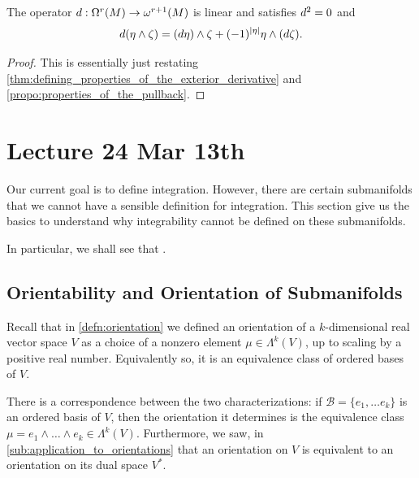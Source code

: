 \documentclass[notoc,notitlepage]{tufte-book}
\begin{document}
\begin{propo}\label{propo:square_of_the_exterior_derivative_is_a_zero_map_on_submanifolds}
  The operator $\mathop{}\!d{} : \Omega^r(M) \to \omega^{r+1}(M)$ is linear and
  satisfies $\mathop{}\!d{^2} = 0$ and
  \begin{equation*}
    \mathop{}\!d{(\eta \land \zeta)} = (\mathop{}\!d{\eta}) \land \zeta + (-1)^{\left|\eta\right|} \eta
    \land (\mathop{}\!d{\zeta}).
  \end{equation*}
\end{propo}

\begin{proof}
  This is essentially just restating
  \cref{thm:defining_properties_of_the_exterior_derivative} and
  \cref{propo:properties_of_the_pullback}.
\end{proof}



\chapter{Lecture 24 Mar 13th}%
\label{chp:lecture_24_mar_13th}

Our current goal is to define integration. However, there are certain
submanifolds that we cannot have a sensible definition for integration. This
section give us the basics to understand why integrability cannot be defined on
these submanifolds.

In particular, we shall see that .

\section{Orientability and Orientation of Submanifolds}%
\label{sec:orientability_and_orientation_of_submanifolds}

Recall that in \cref{defn:orientation} we defined an orientation of a
$k$-dimensional real vector space $V$ as a choice of a nonzero element $\mu \in
\Lambda^k(V)$, up to scaling by a positive real number. Equivalently so, it is
an equivalence class of ordered bases of $V$.

There is a correspondence between the two characterizations: if $\mathcal{B} =
\{ e_1, \ldots e_k \}$ is an ordered basis of $V$, then the orientation it
determines is the equivalence class $\mu = e_1 \land \hdots \land e_k \in
\Lambda^k(V)$. Furthermore, we saw, in \cref{sub:application_to_orientations}
that an orientation on $V$ is equivalent to an orientation on its dual space
$V^*$.
\end{document}

